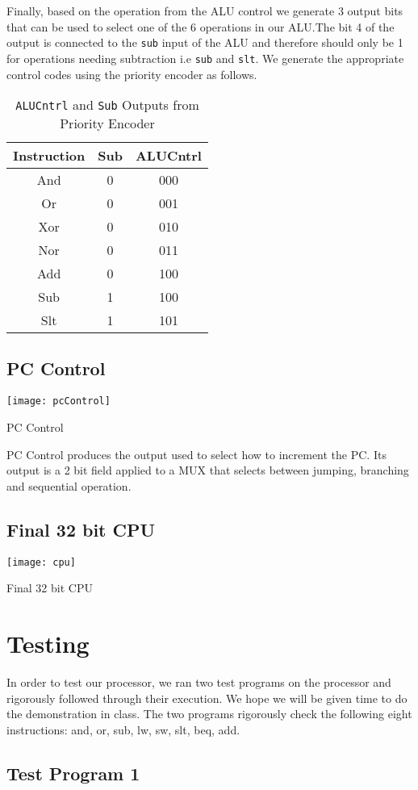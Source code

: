 \documentclass[12pt]{report}
\newcommand{\mychapter}[2]{
    \setcounter{chapter}{#1}
    \setcounter{section}{0}
    \chapter*{#2}
    \addcontentsline{toc}{chapter}{#2}
}
\begin{document}
Finally, based on the operation from the ALU control we generate 3 output bits that can be used to select one of the 6 operations in our ALU.The bit 4 of the output is connected to the \texttt{sub} input of the ALU and therefore should only be 1 for operations needing subtraction i.e \texttt{sub} and \texttt{slt}. We generate the appropriate control codes using the priority encoder as follows.
\begin{longtable}{|c|c|c|}
\caption{\texttt{ALUCntrl} and \texttt{Sub} Outputs from Priority Encoder} \label{aluTab}\\\hline
Instruction&Sub&ALUCntrl\\\hline
And&0&000\\\hline
Or&0&001\\\hline
Xor&0&010\\\hline
Nor&0&011\\\hline
Add&0&100\\\hline
Sub&1&100\\\hline
Slt&1&101\\\hline
\end{longtable}
\section{PC Control}
\begin{center}
\texttt{[image: pcControl]}%
\caption{PC Control}
\end{center}
PC Control produces the output used to select how to increment the PC. Its output is a 2 bit field applied to a MUX that selects between jumping, branching and sequential operation.
\section{Final 32 bit CPU}
 \begin{adjustwidth}{-400pt}{-400pt}
\begin{center}
		\texttt{[image: cpu]}%
\end{center}
\end{adjustwidth}
\caption{Final 32 bit CPU}
\mychapter{6}{Testing}
In order to test our processor, we ran two test programs on the processor and rigorously followed through their execution. We hope we will be given time to do the demonstration in class. The two programs rigorously check the following eight instructions: and, or, sub, lw, sw,
slt, beq, add. 
\section{Test Program 1}
\end{document}
